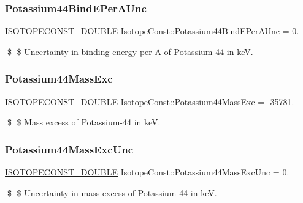 \subsubsection{\texorpdfstring{Potassium44\+Bind\+E\+Per\+A\+Unc}{Potassium44BindEPerAUnc}}
{\footnotesize\ttfamily \mbox{\hyperlink{group___isotope_const-_macros_ga8f45a7272ce02c0b4c65c44636ed719a}{I\+S\+O\+T\+O\+P\+E\+C\+O\+N\+S\+T\+\_\+\+D\+O\+U\+B\+LE}} Isotope\+Const\+::\+Potassium44\+Bind\+E\+Per\+A\+Unc = 0.}

\$ \$ Uncertainty in binding energy per A of Potassium-\/44 in keV. \mbox{\label{group___isotope_const-_potassium-_k44_ga26e2ef59e18f0952ade946b3f4742028}} 
\subsubsection{\texorpdfstring{Potassium44\+Mass\+Exc}{Potassium44MassExc}}
{\footnotesize\ttfamily \mbox{\hyperlink{group___isotope_const-_macros_ga8f45a7272ce02c0b4c65c44636ed719a}{I\+S\+O\+T\+O\+P\+E\+C\+O\+N\+S\+T\+\_\+\+D\+O\+U\+B\+LE}} Isotope\+Const\+::\+Potassium44\+Mass\+Exc = -\/35781.}

\$ \$ Mass excess of Potassium-\/44 in keV. \mbox{\label{group___isotope_const-_potassium-_k44_ga9ade5fa8d20d204d47dd5082d29aa204}} 
\subsubsection{\texorpdfstring{Potassium44\+Mass\+Exc\+Unc}{Potassium44MassExcUnc}}
{\footnotesize\ttfamily \mbox{\hyperlink{group___isotope_const-_macros_ga8f45a7272ce02c0b4c65c44636ed719a}{I\+S\+O\+T\+O\+P\+E\+C\+O\+N\+S\+T\+\_\+\+D\+O\+U\+B\+LE}} Isotope\+Const\+::\+Potassium44\+Mass\+Exc\+Unc = 0.}

\$ \$ Uncertainty in mass excess of Potassium-\/44 in keV. \mbox{\label{group___isotope_const-_potassium-_k44_gac0ab72bd1f78fd5da019b03480b3a0b1}} 
